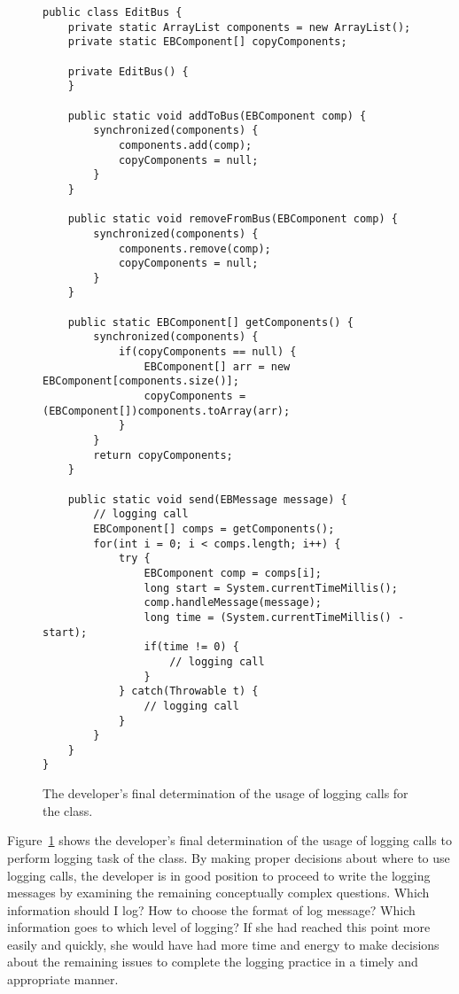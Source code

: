 \begin{figure}[p]
\def\baselinestretch{0.94}
\begin{lstlisting}
public class EditBus {
    private static ArrayList components = new ArrayList();
    private static EBComponent[] copyComponents;

    private EditBus() {
    }

    public static void addToBus(EBComponent comp) {
        synchronized(components) {
            components.add(comp);
            copyComponents = null;
        }
    }
  
    public static void removeFromBus(EBComponent comp) {
        synchronized(components) {
            components.remove(comp);
            copyComponents = null;
        }
    }

    public static EBComponent[] getComponents() {
        synchronized(components) {
            if(copyComponents == null) {
                EBComponent[] arr = new EBComponent[components.size()];
                copyComponents = (EBComponent[])components.toArray(arr);
            }
        }
        return copyComponents;
    }
  
    public static void send(EBMessage message) {
        // logging call
        EBComponent[] comps = getComponents();
        for(int i = 0; i < comps.length; i++) {
            try {
                EBComponent comp = comps[i];
                long start = System.currentTimeMillis();
                comp.handleMessage(message);
                long time = (System.currentTimeMillis() - start);
                if(time != 0) {
                    // logging call
                }
            } catch(Throwable t) {
                // logging call
            }
        }
    }
}
\end{lstlisting}
\caption{The developer's final determination of the usage of logging calls for the  class.\label{ch2-ex-logged}}
\end{figure}

Figure~\ref{ch2-ex-logged} shows the developer's final determination of the usage of logging calls to perform logging task of the  class. By making proper decisions about where to use logging calls, the developer is in good position to proceed to write the logging messages by examining the remaining conceptually complex questions. Which information should I log? How to choose the format of log message? Which information goes to which level of logging? If she had reached this point more easily and quickly, she would have had more time and energy to make decisions about the remaining issues to complete the logging practice in a timely and appropriate manner.

